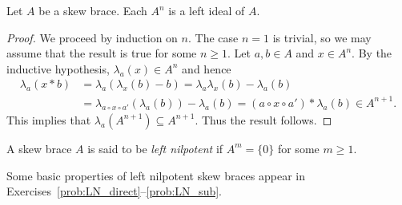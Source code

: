 \begin{proposition}
    \label{pro:left_series}
    Let $A$ be a skew brace. Each $A^{n}$ is a left ideal of $A$.
\end{proposition}

\begin{proof}
    We proceed by induction on $n$. The case $n=1$ is trivial, so we may assume
    that the result is true for some $n\geq1$. Let $a,b\in A$ and $x\in A^n$.
    By the inductive hypothesis, $\lambda_a(x)\in A^n$ and hence
    \begin{equation}
    \label{eq:another_trick}
    \begin{aligned}
        \lambda_a(x*b)&=\lambda_a(\lambda_x(b)-b)
        =\lambda_a\lambda_x(b)-\lambda_a(b)\\
        &=\lambda_{a\circ x\circ a'}(\lambda_a(b))-\lambda_a(b)
        =(a\circ x\circ a')*\lambda_a(b)\in A^{n+1}.
    \end{aligned}
\end{equation}
 This implies
that $\lambda_a(A^{n+1})\subseteq A^{n+1}$. Thus the result
follows.
\end{proof}

\begin{definition}
    A skew brace $A$ is said to be \emph{left nilpotent} if $A^{m}=\{0\}$ for some
    $m\geq1$.
\end{definition}

Some basic properties of left nilpotent skew braces appear in Exercises~\ref{prob:LN_direct}--\ref{prob:LN_sub}. 

    
